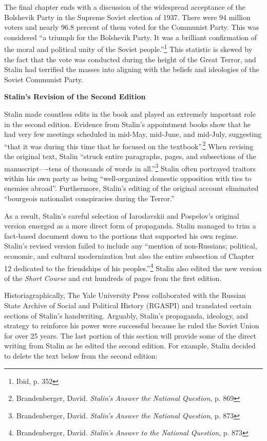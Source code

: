 \documentclass[a4paper, twocolumn]{article}
\begin{document}
The final chapter ends with a discussion of the widespread acceptance
of the Bolshevik Party in the Supreme Soviet election of 1937. There
were 94 million voters and nearly 96.8 percent of them voted for the
Communist Party. This was considered ``a triumph for the Bolshevik
Party. It was a brilliant confirmation of the moral and political
unity of the Soviet people.''\footnote{Ibid, p. 352} This statistic is skewed by the fact
that the vote was conducted during the height of the Great Terror, and
Stalin had terrified the masses into aligning with the beliefs and
ideologies of the Soviet Communist
Party.


\begin{center}\textbf{Stalin's Revision of the Second Edition}\end{center}

	Stalin made countless edits in the book and played an extremely
    important role in the second edition. Evidence from Stalin’s
    appointment books show that he had very few meetings scheduled in
    mid-May, mid-June, and mid-July, suggesting ``that it was during
    this time that he focused on the textbook''.\footnote{Brandenberger, David. \emph{Stalin’s Answer the National Question}, p. 869} When revising the
    original text, Stalin ``struck entire paragraphs, pages, and
    subsections of the manuscript—-tens of thousands of words in
    all.''\footnote{Brandenberger, David. \emph{Stalin’s Answer the National Question}, p. 873} Stalin often portrayed traitors within his own party as
    being ``well-organized domestic opposition with ties to enemies
    abroad''. Furthermore, Stalin's editing of the original account
    eliminated ``bourgeois nationalist conspiracies during the 
    Terror.''

As a result, Stalin's careful selection of Iaroslavskii and Pospelov's
original version emerged as a more direct form of propaganda. Stalin
managed to trim a fact-based document down to the portions
that supported his own regime. Stalin's revised version failed to
include any ``mention of non-Russians; political, economic, and
cultural modernization but also the entire subsection of Chapter 12
dedicated to the friendships of his peoples.''\footnote{Brandenberger, David. \emph{Stalin’s Answer to the National Question}, p. 873}  Stalin also edited
the new version of the \emph{Short Course} and cut hundreds of pages from the
first edition.

Historiagraphically, The Yale University Press collaborated with the Russian State Archive
of Social and Political History (RGASPI) and translated certain
sections of Stalin's handwriting. Arguably, Stalin's propaganda,
ideology, and strategy to reinforce his power were successful because
he ruled the Soviet Union for over 25 years. The last portion of this
section will provide some of the direct writing from Stalin as he
edited the second edition. For example, Stalin decided to delete the
text below from the second edition:
\end{document}
